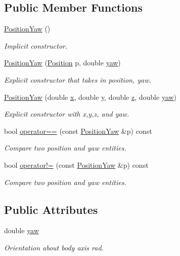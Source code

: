 \subsection*{Public Member Functions}
\begin{DoxyCompactItemize}
\item 
\hyperlink{structPositionYaw_a27f89c7703b62e5120c669822c98bcf1}{Position\-Yaw} ()
\begin{DoxyCompactList}\small\item\em Implicit constructor. \end{DoxyCompactList}\item 
\hyperlink{structPositionYaw_a0a03ecfbad91c4c48a6aed44f4933a74}{Position\-Yaw} (\hyperlink{structPosition}{Position} p, double \hyperlink{structPositionYaw_a712a15ba9739cb5f4e31ea973074b8bf}{yaw})
\begin{DoxyCompactList}\small\item\em Explicit constructor that takes in position, yaw. \end{DoxyCompactList}\item 
\hyperlink{structPositionYaw_ae5642ce9e93710cf9cda7263511300f0}{Position\-Yaw} (double \hyperlink{structPosition_a9abbe738bad177de91fe4774099c1260}{x}, double \hyperlink{structPosition_a75f48c2a1d2c7131b8be1a0687ae72c8}{y}, double \hyperlink{structPosition_ab26043bc2f8f6094818c17dd44e43228}{z}, double \hyperlink{structPositionYaw_a712a15ba9739cb5f4e31ea973074b8bf}{yaw})
\begin{DoxyCompactList}\small\item\em Explicit constructor with x,y,z, and yaw. \end{DoxyCompactList}\item 
bool \hyperlink{structPositionYaw_a74eb4415b12fe9c42e102e82d2bd52cb}{operator==} (const \hyperlink{structPositionYaw}{Position\-Yaw} \&p) const 
\begin{DoxyCompactList}\small\item\em Compare two position and yaw entities. \end{DoxyCompactList}\item 
bool \hyperlink{structPositionYaw_a9302e53f05d5d07d11dcdd1d0c23610b}{operator!=} (const \hyperlink{structPositionYaw}{Position\-Yaw} \&p) const 
\begin{DoxyCompactList}\small\item\em Compare two position and yaw entities. \end{DoxyCompactList}\end{DoxyCompactItemize}
\subsection*{Public Attributes}
\begin{DoxyCompactItemize}
\item 
double \hyperlink{structPositionYaw_a712a15ba9739cb5f4e31ea973074b8bf}{yaw}
\begin{DoxyCompactList}\small\item\em Orientation about body axis rad. \end{DoxyCompactList}\end{DoxyCompactItemize}


